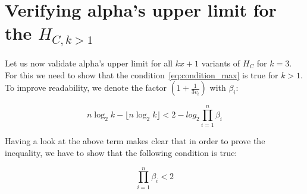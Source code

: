 





\section{Verifying alpha's upper limit for the $H_{C,k>1}$}
Let us now validate alpha's upper limit for all $kx+1$ variants of $H_C$ for $k=3$. For this we need to show that the condition~\ref{eq:condition_max} is true for $k>1$. To improve readability, we denote the factor $(1+\frac{1}{3v_i})$ with $\beta_i$:

\begin{equation*}
n\log_2k-\lfloor n\log_2k\rfloor<2-log_2\prod_{i=1}^{n}\beta_i
\end{equation*}

Having a look at the above term makes clear that in order to prove the inequality, we have to show that the following condition is true:

\begin{equation}
\label{eq:condition_beta_lt_2}
	\prod_{i=1}^{n}\beta_i<2
\end{equation}

